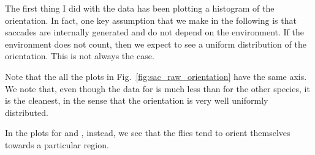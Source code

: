 The first thing I did with the data has been plotting a histogram of the orientation.
In fact, one key assumption that we make in the following is that saccades are internally generated and do not depend on the environment. If the environment does not count, then we expect to see a uniform distribution of the orientation. This is not always the case.

Note that the all the plots in Fig.~\ref{fig:sac_raw_orientation} have the same axis. We note that, even though the data for \Dpseudoobscura is much less than for the other species, it is the cleanest, in the sense that the orientation is very well uniformly distributed.

In the plots for \Dhydei and \Darizonae, instead, we see that the flies tend to orient themselves towards a particular region.